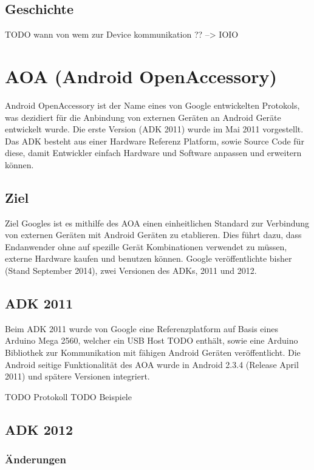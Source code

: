 \documentclass[12pt,journal,compsoc]{IEEEtran}
\begin{document}
\subsection{Geschichte}

TODO wann von wem zur Device kommunikation ?? --> IOIO


\section{AOA (Android OpenAccessory)}
Android OpenAccessory ist der Name eines von Google entwickelten Protokols, was 
dezidiert für die Anbindung von externen Geräten an Android Geräte entwickelt wurde.
Die erste Version (ADK 2011) wurde im Mai 2011 vorgestellt.
Das ADK besteht aus einer Hardware Referenz Platform, sowie Source Code für diese, damit 
Entwickler einfach Hardware und Software anpassen und erweitern können.
\cite{developaoa}
\subsection{Ziel}
Ziel Googles ist es mithilfe des AOA einen einheitlichen Standard zur Verbindung von externen Geräten mit Android Geräten zu etablieren.
Dies führt dazu, dass Endanwender ohne auf spezille Gerät Kombinationen verwendet zu müssen, externe Hardware kaufen und benutzen können.
Google veröffentlichte bisher (Stand September 2014), zwei Versionen des ADKs, 2011 und 2012. 

\subsection{ADK 2011}
Beim ADK 2011 wurde von Google eine
Referenzplatform auf Basis eines Arduino Mega 2560, welcher ein USB Host TODO enthält, sowie eine Arduino Bibliothek zur Kommunikation mit fähigen Android Geräten veröffentlicht.
Die Android seitige Funktionalität des AOA wurde in Android 2.3.4 (Release April 2011) und spätere Versionen integriert. 

TODO Protokoll
TODO Beispiele
\subsection{ADK 2012}
\subsubsection{Änderungen}
\end{document}

